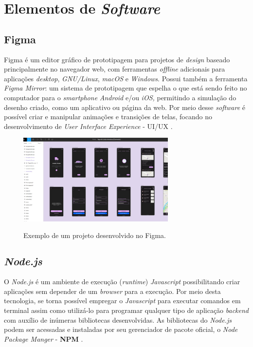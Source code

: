\section{Elementos de \textit{Software}}

\subsection{Figma}

Figma é um editor gráfico de prototipagem para projetos de \textit{design} baseado principalmente no navegador web, com ferramentas \textit{offline} adicionais para aplicações \textit{desktop}, \textit{GNU/Linux}, \textit{macOS} e \textit{Windows}. Possui também a ferramenta \textit{Figma Mirror}: um sistema de prototipagem que espelha o que está sendo feito no computador para o \textit{smartphone} \textit{Android} e/ou \textit{iOS,} permitindo a simulação do desenho criado, como um aplicativo ou página da web. Por meio desse \textit{software} é possível criar e manipular animações e transições de telas, focando no desenvolvimento de \textit{User Interface Experience} - UI/UX \cite{Figma}.

\begin{figure}[H]
	\centering
	\caption{Exemplo de um projeto desenvolvido no Figma.}
	\includegraphics[width=0.7\textwidth]{figuras/figma_exemplo.jpg}
	\label{fig:figma_exemplo}
\end{figure} 



\subsection{\textit{Node.js}}

O \textit{Node.js} é um ambiente de execução (\textit{runtime}) \textit{Javascript} possibilitando criar aplicações sem depender de um \textit{browser} para a execução. Por meio desta tecnologia, se torna possível empregar o \textit{Javascript} para executar comandos em terminal assim como utilizá-lo para programar qualquer tipo de aplicação \textit{backend} com auxílio de inúmeras bibliotecas desenvolvidas. As bibliotecas do \textit{Node.js} podem ser acessadas e instaladas por seu gerenciador de pacote oficial, o \textit{Node Package Manger} - \textbf{NPM} \cite{NodeJs}.


